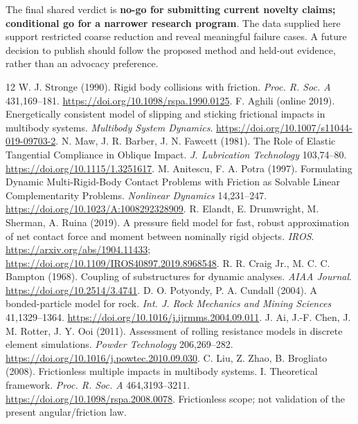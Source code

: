 \documentclass[11pt,a4paper]{article}
\begin{document}
The final shared verdict is \textbf{no-go for submitting current novelty claims; conditional go for a narrower research program}. The data supplied here support restricted coarse reduction and reveal meaningful failure cases. A future decision to publish should follow the proposed method and held-out evidence, rather than an advocacy preference.

\begin{thebibliography}{12}
 W. J. Stronge (1990). Rigid body collisions with friction. \emph{Proc. R. Soc. A} 431,169--181. \url{https://doi.org/10.1098/rspa.1990.0125}.
 F. Aghili (online 2019). Energetically consistent model of slipping and sticking frictional impacts in multibody systems. \emph{Multibody System Dynamics}. \url{https://doi.org/10.1007/s11044-019-09703-2}.
 N. Maw, J. R. Barber, J. N. Fawcett (1981). The Role of Elastic Tangential Compliance in Oblique Impact. \emph{J. Lubrication Technology} 103,74--80. \url{https://doi.org/10.1115/1.3251617}.
 M. Anitescu, F. A. Potra (1997). Formulating Dynamic Multi-Rigid-Body Contact Problems with Friction as Solvable Linear Complementarity Problems. \emph{Nonlinear Dynamics} 14,231--247. \url{https://doi.org/10.1023/A:1008292328909}.
 R. Elandt, E. Drumwright, M. Sherman, A. Ruina (2019). A pressure field model for fast, robust approximation of net contact force and moment between nominally rigid objects. \emph{IROS}. \url{https://arxiv.org/abs/1904.11433}; \url{https://doi.org/10.1109/IROS40897.2019.8968548}.
 R. R. Craig Jr., M. C. C. Bampton (1968). Coupling of substructures for dynamic analyses. \emph{AIAA Journal}. \url{https://doi.org/10.2514/3.4741}.
 D. O. Potyondy, P. A. Cundall (2004). A bonded-particle model for rock. \emph{Int. J. Rock Mechanics and Mining Sciences} 41,1329--1364. \url{https://doi.org/10.1016/j.ijrmms.2004.09.011}.
 J. Ai, J.-F. Chen, J. M. Rotter, J. Y. Ooi (2011). Assessment of rolling resistance models in discrete element simulations. \emph{Powder Technology} 206,269--282. \url{https://doi.org/10.1016/j.powtec.2010.09.030}.
 C. Liu, Z. Zhao, B. Brogliato (2008). Frictionless multiple impacts in multibody systems. I. Theoretical framework. \emph{Proc. R. Soc. A} 464,3193--3211. \url{https://doi.org/10.1098/rspa.2008.0078}. Frictionless scope; not validation of the present angular/friction law.
\end{thebibliography}
\end{document}
